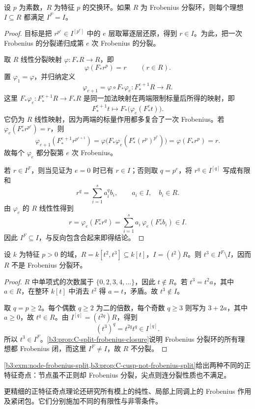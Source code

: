 \begin{proposition}\label{b3:prop:C-split-frobenius-closure}
	设 \(p\) 为素数，\(R\) 为特征 \(p\) 的交换环。如果 \(R\) 为 Frobenius 分裂环，则每个理想 \(I\subseteq R\) 都满足 \(I^F=I\)。
\end{proposition}
\begin{proof}
	目标是把 \(r^{p^e}\in I^{[p^e]}\) 中的 \(e\) 层取幂逐层还原，得到 \(r\in I\)。为此，把一次 Frobenius 的分裂递归成第 \(e\) 次 Frobenius 的分裂。

	取 \(R\) 线性分裂映射 \(\varphi:F_*R\to R\)，即
	\[
		\varphi(F_*r^p)=r\qquad(r\in R).
	\]
	置 \(\varphi_1=\varphi\)，并归纳定义
	\[
		\varphi_{e+1}=\varphi\circ F_*\varphi_e: F_*^{e+1}R\longrightarrow R.
	\]
	这里 \(F_*\varphi_e:F_*^{e+1}R\to F_*R\) 是同一加法映射在两端限制标量后所得的映射，即
	\[
		F_*^{e+1}t\longmapsto F_*\bigl(\varphi_e(F_*^e t)\bigr).
	\]
	它仍为 \(R\) 线性映射，因为两端的标量作用都多复合了一次 Frobenius。若 \(\varphi_e(F_*^e r^{p^e})=r\)，则
	\[
		\varphi_{e+1}(F_*^{e+1}r^{p^{e+1}}) =\varphi\bigl(F_*\varphi_e(F_*^e(r^p)^{p^e})\bigr) =\varphi(F_*r^p)=r.
	\]
	故每个 \(\varphi_e\) 都分裂第 \(e\) 次 Frobenius。

	若 \(r\in I^F\)，则当见证为 \(e=0\) 时已有 \(r\in I\)；否则取 \(q=p^e\)，将 \(r^q\in I^{[q]}\) 写成有限和
	\[
		r^q=\sum_{i=1}^s a_i^q b_i, \qquad a_i\in I,\quad b_i\in R.
	\]
	由 \(\varphi_e\) 的 \(R\) 线性性得到
	\[
		r=\varphi_e(F_*^e r^q) =\sum_{i=1}^s a_i\,\varphi_e(F_*^e b_i)\in I.
	\]
	因此 \(I^F\subseteq I\)，与反向包含合起来即得结论。
\end{proof}

\begin{proposition}\label{b3:prop:C-cusp-not-frobenius-split}
	设 \(k\) 为特征 \(p>0\) 的域，\(R=k[t^2,t^3]\subseteq k[t]\)，\(I=(t^2)R\)。则 \(t^3\in I^F\setminus I\)，因而 \(R\) 不是 Frobenius 分裂环。
\end{proposition}
\begin{proof}
	\(R\) 中单项式的次数属于 \(\{0,2,3,4,\ldots\}\)，因此 \(t\notin R\)。若 \(t^3=t^2a\)，其中 \(a\in R\)，在整环 \(k[t]\) 中消去 \(t^2\) 得 \(a=t\)，矛盾。故 \(t^3\notin I\)。

	取 \(q=p\ge2\)。每个偶数 \(q\ge2\) 为二的倍数，每个奇数 \(q\ge3\) 则写为 \(3+2a\)，其中 \(a\ge0\)，故 \(t^q\in R\)。由 \(I^{[q]}=(t^{2q})R\)，得到
	\[
		(t^3)^q=t^{2q}t^q\in I^{[q]}.
	\]
	所以 \(t^3\in I^F\)。\cref{b3:prop:C-split-frobenius-closure}说明 Frobenius 分裂环的所有理想都 Frobenius 闭，而这里 \(I^F\ne I\)，故 \(R\) 不分裂。
\end{proof}

\cref{b3:exm:node-frobenius-split,b3:prop:C-cusp-not-frobenius-split}给出两种不同的正特征奇点：节点虽不正则却 Frobenius 分裂，尖点则连分裂性质也不满足。

\ProseParagraphBreak
更精细的正特征奇点理论还研究所有模上的纯性、局部上同调上的 Frobenius 作用及紧闭包。它们分别施加不同的有限性与非零条件。
